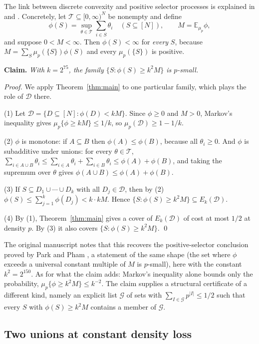 \documentclass[11pt,letterpaper]{article}
\theoremstyle{definition}
\theoremstyle{remark}
\numberwithin{equation}{section}
\begin{document}
The link between discrete convexity and positive selector processes is
explained in \cite[Section~7]{Talagrand10} and
\cite[Proposition~13.3.3]{Talagrand21}. Concretely, let
$\mathcal T\subseteq[0,\infty)^N$ be nonempty and define
\[
\phi(S)=\sup_{\theta\in\mathcal T}\sum_{i\in S}\theta_i\quad(S\subseteq[N]),
\qquad M=\mathbb E_{\mu_p}\phi,
\]
and suppose $0<M<\infty$. Then $\phi(S)<\infty$ for \emph{every} $S$,
because $M=\sum_S\mu_p(\{S\})\phi(S)$ and every $\mu_p(\{S\})$ is
positive.

\smallskip
\noindent\textbf{Claim.} \emph{With $k=2^{75}$, the family
$\{S:\phi(S)\ge k^2M\}$ is $p$-small.}

\smallskip
\noindent\emph{Proof.} We apply Theorem~\ref{thm:main} to one particular
family, which plays the role of $\mathcal D$ there.

(1) Let $\mathcal D=\{D\subseteq[N]:\phi(D)<kM\}$. Since $\phi\ge0$ and
$M>0$, Markov's inequality gives $\mu_p\{\phi\ge kM\}\le1/k$, so
$\mu_p(\mathcal D)\ge1-1/k$.

(2) $\phi$ is monotone: if $A\subseteq B$ then $\phi(A)\le\phi(B)$,
because all $\theta_i\ge0$. And $\phi$ is subadditive under unions: for
every $\theta\in\mathcal T$,
$\sum_{i\in A\cup B}\theta_i\le\sum_{i\in A}\theta_i+\sum_{i\in B}\theta_i
\le\phi(A)+\phi(B)$, and taking the supremum over $\theta$ gives
$\phi(A\cup B)\le\phi(A)+\phi(B)$.

(3) If $S\subseteq D_1\cup\cdots\cup D_k$ with all $D_j\in\mathcal D$,
then by (2) $\phi(S)\le\sum_{j=1}^k\phi(D_j)<k\cdot kM$. Hence
$\{S:\phi(S)\ge k^2M\}\subseteq E_k(\mathcal D)$.

(4) By (1), Theorem~\ref{thm:main} gives a cover of $E_k(\mathcal D)$ of
cost at most $1/2$ at density $p$. By (3) it also covers
$\{S:\phi(S)\ge k^2M\}$. \qed

\smallskip
The original manuscript notes that this recovers the positive-selector
conclusion proved by Park and Pham \cite[Theorem~1.2]{ParkPham24}, a
statement of the same shape (the set where $\phi$ exceeds a universal
constant multiple of $M$ is $p$-small), here with the constant
$k^2=2^{150}$. As for what the claim adds: Markov's inequality alone
bounds only the probability, $\mu_p\{\phi\ge k^2M\}\le k^{-2}$. The claim
supplies a structural certificate of a different kind, namely an explicit
list $\mathcal G$ of sets with $\sum_{I\in\mathcal G}p^{|I|}\le1/2$ such
that every $S$ with $\phi(S)\ge k^2M$ contains a member of $\mathcal G$.

\subsection{Two unions at constant density loss}
\label{sec:two-union}
\end{document}
